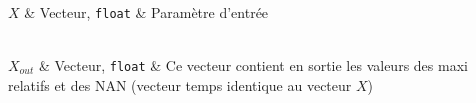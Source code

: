 \begin{tabarg}
\\
\hline
$X$ & Vecteur, {\tt float} & Param\`etre d'entr\'ee\\
\end{tabarg}

\medskip
\begin{tabarg}
\\
\hline
$X_{out}$ & Vecteur, {\tt float} & Ce vecteur contient en sortie les valeurs des maxi relatifs et des NAN (vecteur temps identique au vecteur $X$)\\
\end{tabarg}
